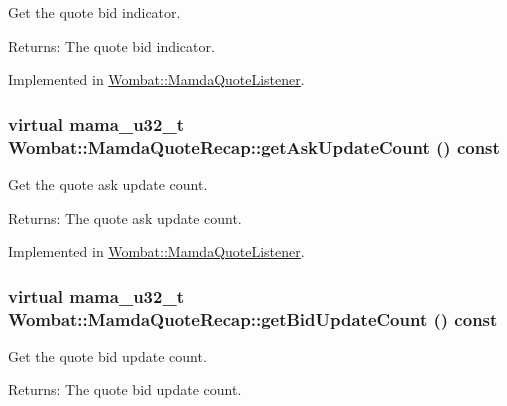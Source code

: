 Get the quote bid indicator. 

\begin{Desc}
\item[Returns:]The quote bid indicator. \end{Desc}


Implemented in \hyperlink{classWombat_1_1MamdaQuoteListener_2ac1e2dabc677e93e414cf0c1d1fa94f}{Wombat::Mamda\-Quote\-Listener}.\hypertarget{classWombat_1_1MamdaQuoteRecap_99ae27dd8ca7ed8507afcc66cdfe0f1c}{
\subsubsection[getAskUpdateCount]{\setlength{\rightskip}{0pt plus 5cm}virtual mama\_\-u32\_\-t Wombat::Mamda\-Quote\-Recap::get\-Ask\-Update\-Count () const}}
\label{classWombat_1_1MamdaQuoteRecap_99ae27dd8ca7ed8507afcc66cdfe0f1c}


Get the quote ask update count. 

\begin{Desc}
\item[Returns:]The quote ask update count. \end{Desc}


Implemented in \hyperlink{classWombat_1_1MamdaQuoteListener_f1cf490659772cef488d7207b3587958}{Wombat::Mamda\-Quote\-Listener}.\hypertarget{classWombat_1_1MamdaQuoteRecap_36e64c863a6c89641b58451c2792744b}{
\subsubsection[getBidUpdateCount]{\setlength{\rightskip}{0pt plus 5cm}virtual mama\_\-u32\_\-t Wombat::Mamda\-Quote\-Recap::get\-Bid\-Update\-Count () const}}
\label{classWombat_1_1MamdaQuoteRecap_36e64c863a6c89641b58451c2792744b}


Get the quote bid update count. 

\begin{Desc}
\item[Returns:]The quote bid update count. \end{Desc}


